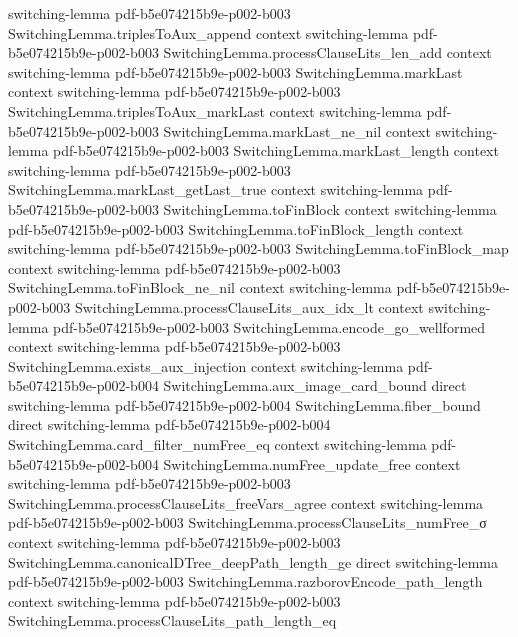 \begin{lemma}
  {switching-lemma}
  {pdf-b5e074215b9e-p002-b003}
\proofstep
  {SwitchingLemma.triplesToAux_append}
  {context}
  {switching-lemma}
  {pdf-b5e074215b9e-p002-b003}
\proofstep
  {SwitchingLemma.processClauseLits_len_add}
  {context}
  {switching-lemma}
  {pdf-b5e074215b9e-p002-b003}
\proofstep
  {SwitchingLemma.markLast}
  {context}
  {switching-lemma}
  {pdf-b5e074215b9e-p002-b003}
\proofstep
  {SwitchingLemma.triplesToAux_markLast}
  {context}
  {switching-lemma}
  {pdf-b5e074215b9e-p002-b003}
\proofstep
  {SwitchingLemma.markLast_ne_nil}
  {context}
  {switching-lemma}
  {pdf-b5e074215b9e-p002-b003}
\proofstep
  {SwitchingLemma.markLast_length}
  {context}
  {switching-lemma}
  {pdf-b5e074215b9e-p002-b003}
\proofstep
  {SwitchingLemma.markLast_getLast_true}
  {context}
  {switching-lemma}
  {pdf-b5e074215b9e-p002-b003}
\proofstep
  {SwitchingLemma.toFinBlock}
  {context}
  {switching-lemma}
  {pdf-b5e074215b9e-p002-b003}
\proofstep
  {SwitchingLemma.toFinBlock_length}
  {context}
  {switching-lemma}
  {pdf-b5e074215b9e-p002-b003}
\proofstep
  {SwitchingLemma.toFinBlock_map}
  {context}
  {switching-lemma}
  {pdf-b5e074215b9e-p002-b003}
\proofstep
  {SwitchingLemma.toFinBlock_ne_nil}
  {context}
  {switching-lemma}
  {pdf-b5e074215b9e-p002-b003}
\proofstep
  {SwitchingLemma.processClauseLits_aux_idx_lt}
  {context}
  {switching-lemma}
  {pdf-b5e074215b9e-p002-b003}
\proofstep
  {SwitchingLemma.encode_go_wellformed}
  {context}
  {switching-lemma}
  {pdf-b5e074215b9e-p002-b003}
\proofstep
  {SwitchingLemma.exists_aux_injection}
  {context}
  {switching-lemma}
  {pdf-b5e074215b9e-p002-b004}
\proofstep
  {SwitchingLemma.aux_image_card_bound}
  {direct}
  {switching-lemma}
  {pdf-b5e074215b9e-p002-b004}
\proofstep
  {SwitchingLemma.fiber_bound}
  {direct}
  {switching-lemma}
  {pdf-b5e074215b9e-p002-b004}
\proofstep
  {SwitchingLemma.card_filter_numFree_eq}
  {context}
  {switching-lemma}
  {pdf-b5e074215b9e-p002-b004}
\proofstep
  {SwitchingLemma.numFree_update_free}
  {context}
  {switching-lemma}
  {pdf-b5e074215b9e-p002-b003}
\proofstep
  {SwitchingLemma.processClauseLits_freeVars_agree}
  {context}
  {switching-lemma}
  {pdf-b5e074215b9e-p002-b003}
\proofstep
  {SwitchingLemma.processClauseLits_numFree_σ}
  {context}
  {switching-lemma}
  {pdf-b5e074215b9e-p002-b003}
\proofstep
  {SwitchingLemma.canonicalDTree_deepPath_length_ge}
  {direct}
  {switching-lemma}
  {pdf-b5e074215b9e-p002-b003}
\proofstep
  {SwitchingLemma.razborovEncode_path_length}
  {context}
  {switching-lemma}
  {pdf-b5e074215b9e-p002-b003}
\proofstep
  {SwitchingLemma.processClauseLits_path_length_eq}

\end{lemma}
